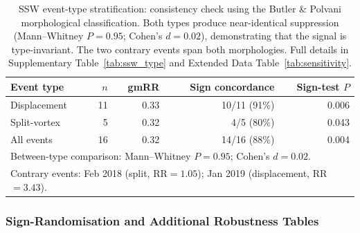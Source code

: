 \documentclass[11pt,letterpaper]{article}
\begin{document}
\begin{table}[htbp]
\centering
\caption{SSW event-type stratification: consistency check using the Butler \& Polvani\cite{Butler2015} morphological classification. Both types produce near-identical suppression (Mann--Whitney $P = 0.95$; Cohen's $d = 0.02$), demonstrating that the signal is type-invariant. The two contrary events span both morphologies. Full details in Supplementary Table~\ref{tab:ssw_type} and Extended Data Table~\ref{tab:sensitivity}.}
\label{tab:split_displacement}
\begin{tabular}{lrrrr}
\toprule
Event type & $n$ & gmRR & Sign concordance & Sign-test $P$ \\
\midrule
Displacement & 11 & 0.33 & 10/11 (91\%) & 0.006 \\
Split-vortex & 5 & 0.32 & 4/5 (80\%) & 0.043 \\
All events & 16 & 0.32 & 14/16 (88\%) & 0.004 \\
\bottomrule
\multicolumn{5}{l}{\footnotesize Between-type comparison: Mann--Whitney $P = 0.95$; Cohen's $d = 0.02$.} \\
\multicolumn{5}{l}{\footnotesize Contrary events: Feb 2018 (split, RR$=1.05$); Jan 2019 (displacement, RR$=3.43$).} \\
\end{tabular}
\end{table}


\subsubsection*{Sign-Randomisation and Additional Robustness Tables}
\end{document}
